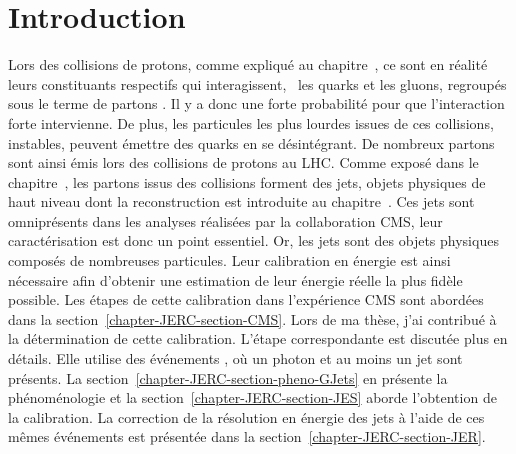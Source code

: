 \section{Introduction}\label{chapter-JERC-section-introduction}
Lors des collisions de protons, comme expliqué au chapitre~,
ce sont en réalité leurs constituants respectifs qui interagissent,
\ie\ les quarks et les gluons, regroupés sous le terme de \og partons \fg.
Il y a donc une forte probabilité pour que l'interaction forte intervienne.
De plus, les particules les plus lourdes issues de ces collisions, instables, peuvent émettre des quarks en se désintégrant.
De nombreux partons sont ainsi émis lors des collisions de protons au LHC.
Comme exposé dans le chapitre~, les partons issus des collisions forment des jets, objets physiques de haut niveau dont la reconstruction est introduite au chapitre~.
Ces jets sont omniprésents dans les analyses réalisées par la collaboration CMS,
leur caractérisation est donc un point essentiel.
Or, les jets sont des objets physiques composés de nombreuses particules.
Leur calibration en énergie est ainsi nécessaire afin d'obtenir une estimation de leur énergie réelle la plus fidèle possible.
Les étapes de cette calibration dans l'expérience CMS sont abordées dans la section~\ref{chapter-JERC-section-CMS}.
Lors de ma thèse, j'ai contribué à la détermination de cette calibration.
L'étape correspondante est discutée plus en détails.
Elle utilise des événements \Gjets, où un photon et au moins un jet sont présents.
La section~\ref{chapter-JERC-section-pheno-GJets} en présente la phénoménologie
et
la section~\ref{chapter-JERC-section-JES} aborde l'obtention de la calibration.
La correction de la résolution en énergie des jets à l'aide de ces mêmes événements est présentée dans la section~\ref{chapter-JERC-section-JER}.